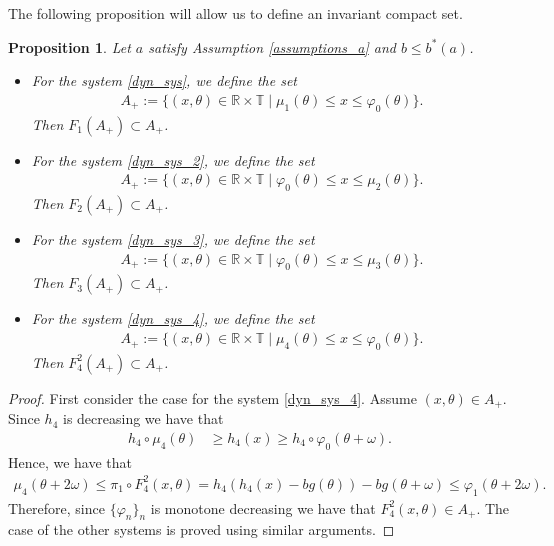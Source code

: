 \documentclass[12pt]{article}
\newcommand{\T}{\mathbb{T}}
\newcommand{\R}{\mathbb{R}}
\theoremstyle{plain}
\newtheorem{prop}[defn]{Proposition}
\theoremstyle{remark}
\theoremstyle{definition}
\begin{document}
The following proposition will allow us to define an invariant compact set.
\begin{prop}\label{attract_prop}
    Let $a$ satisfy Assumption \eqref{assumptions_a} and $b\leq b^*(a)$.
    \begin{itemize}
        \item For the system \eqref{dyn_sys}, we define the set
        \begin{align*}
            A_{+}:=\{(x,\theta)\in\R\times\T\mid\mu_1(\theta)\leq x \leq\varphi_0(\theta)\}.
        \end{align*}
        Then $F_{1}(A_{+})\subset A_{+}$.
        \item For the system \eqref{dyn_sys_2}, we define the set
        \begin{align*}
            A_{+}:=\{(x,\theta)\in\R\times\T\mid\varphi_0(\theta)\leq x \leq\mu_2(\theta)\}.
        \end{align*}
        Then $F_{2}(A_{+})\subset A_{+}$.
        \item For the system \eqref{dyn_sys_3}, we define the set
        \begin{align*}
            A_{+}:=\{(x,\theta)\in\R\times\T\mid\varphi_0(\theta)\leq x \leq\mu_3(\theta)\}.
        \end{align*}
        Then $F_{3}(A_{+})\subset A_{+}$.
        \item For the system \eqref{dyn_sys_4}, we define the set
        \begin{align*}
            A_{+}:=\{(x,\theta)\in\R\times\T\mid\mu_4(\theta)\leq x\leq \varphi_0(\theta)\}.
        \end{align*}
        Then $F_{4}^2(A_{+})\subset A_{+}$.
    \end{itemize}
\end{prop}
\begin{proof}
    First consider the case for the system \eqref{dyn_sys_4}. Assume $(x,\theta)\in A_{+}$. Since $h_4$ is decreasing we have that
    \begin{align*}
        h_4\circ\mu_4(\theta) &\geq h_4(x) \geq h_4\circ\varphi_0(\theta+\omega).
    \end{align*}
    Hence, we have that
    \begin{align*}
        \mu_4(\theta+2\omega) \leq \pi_1\circ F_{4}^2(x,\theta) = h_4(h_{4}(x) - b g(\theta)) - b g(\theta+\omega) \leq \varphi_1(\theta+2\omega).
    \end{align*}
    Therefore, since $\{\varphi_n\}_n$ is monotone decreasing we have that $F_{4}^2(x,\theta)\in A_{+}$. The case of the other systems is proved using similar arguments. 
\end{proof}
\end{document}
